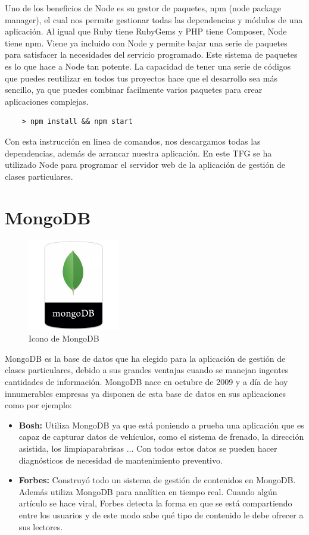 Uno de los beneficios de Node es su gestor de paquetes, npm (node package manager), el cual nos permite gestionar todas las dependencias y módulos de una aplicación. Al igual que Ruby tiene RubyGems y PHP tiene Composer, Node tiene npm.
Viene ya incluido con Node y permite bajar una serie de paquetes para satisfacer la necesidades del servicio programado.
Este sistema de paquetes es lo que hace a Node tan potente. La capacidad de tener una serie de códigos que puedes reutilizar en todos tus proyectos hace que el desarrollo sea más sencillo, ya que puedes combinar facilmente varios paquetes para crear aplicaciones complejas.

\begin{lstlisting}
    > npm install && npm start
\end{lstlisting}

Con esta instrucción en linea de comandos, nos descargamos todas las dependencias, además de arrancar nuestra aplicación.
En este TFG se ha utilizado Node para programar el servidor web de la aplicación de gestión de clases particulares.


\section{MongoDB}
\begin{figure}[!h]
    \centering
    \includegraphics[width=40mm]{img/infraestructura/mongo2.png}
    \caption{Icono de MongoDB}
\end{figure}

MongoDB\cite{mongodb} es la base de datos que ha elegido para la aplicación de gestión de clases particulares, debido a sus grandes ventajas cuando se manejan ingentes cantidades de información. MongoDB nace en octubre de 2009 y a día de hoy innumerables empresas ya disponen de esta base de datos en sus aplicaciones como por ejemplo:
\begin{itemize}
\item \textbf{Bosh:} Utiliza MongoDB ya que está poniendo a prueba una aplicación que es capaz de capturar datos de vehículos, como el sistema de frenado, la dirección asistida, los limpiaparabrisas ... Con todos estos datos se pueden hacer diagnósticos de necesidad de mantenimiento preventivo.


\item \textbf{Forbes:} Construyó todo un sistema de gestión de contenidos en MongoDB. Además utiliza MongoDB para analítica en tiempo real. Cuando algún artículo se hace viral, Forbes detecta la forma en que se está compartiendo entre los usuarios y de este modo sabe qué tipo de contenido le debe ofrecer a sus lectores.
\end{itemize}

